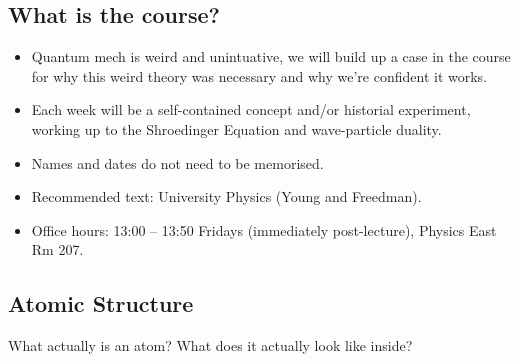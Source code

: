 
\subsection*{What is the course?}
\begin{itemize}
    \item Quantum mech is weird and unintuative, we will build up a case in the course for why this weird theory was necessary and why we're confident it works.
    \item Each week will be a self-contained concept and/or historial experiment, working up to the Shroedinger Equation and wave-particle duality.
    \item Names and dates do not need to be memorised.
    \item Recommended text: University Physics (Young and Freedman).
    \item Office hours: 13:00 -- 13:50 Fridays (immediately post-lecture), Physics East Rm 207.
\end{itemize}

\subsection*{Atomic Structure}
What actually is an atom? What does it actually look like inside?

